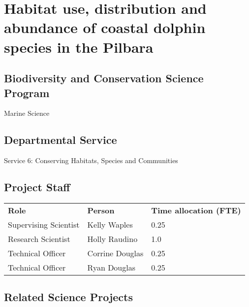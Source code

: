 \documentclass[version=last,
    paper=a4,                               %
    10pt,                                   %
    dvipsnames,
    oneside,                              %
    headings=openany,                       %
    open=any,
    BCOR=7mm,                               %
    DIV=15,     %
]{scrbook}
\begin{document}
\frontmatter
\maketitle
\mainmatter



\section*{Habitat use, distribution and abundance of coastal dolphin species in
the Pilbara
}



\subsection*{Biodiversity and Conservation Science Program}

Marine Science




\subsection*{Departmental Service}

Service 6: Conserving Habitats, Species and Communities


\subsection*{Project Staff}
\begin{tabu} {X X X}
\textbf{Role} & \textbf{Person} & \textbf{Time allocation (FTE)}\\

Supervising Scientist & Kelly Waples & 0.25\\

Research Scientist & Holly Raudino & 1.0\\

Technical Officer & Corrine Douglas & 0.25\\

Technical Officer & Ryan Douglas & 0.25\\

\end{tabu}




\subsection*{Related Science Projects}
\end{document}
